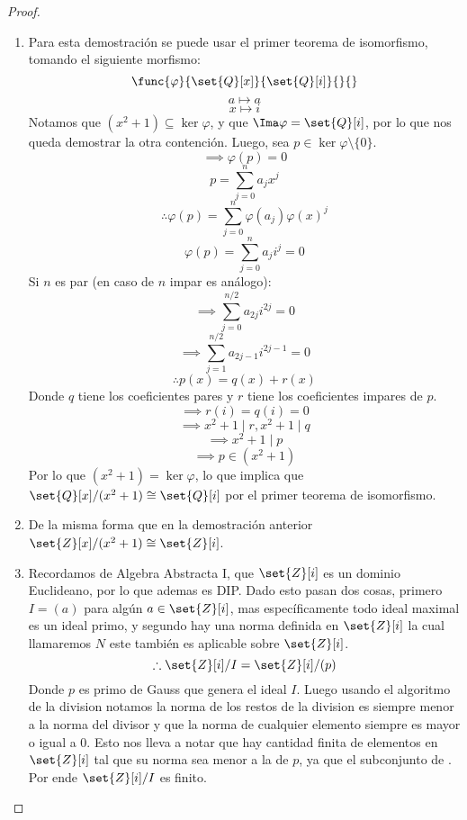 \documentclass[11pt]{article}
\begin{document}
\begin{enumerate}
\begin{proof}
\begin{enumerate}[label=(\alph*)]
                \item Para esta demostración se puede usar el primer teorema de isomorfismo, tomando el siguiente morfismo:
                \[\func{\varphi}{\set{Q}[x]}{\set{Q}[i]}{}{}\]
                \[a\mapsto a\]
                \[x\mapsto i\]
                Notamos que $(x^2+1)\subseteq\ker\varphi$, y que $\Ima\varphi=\set{Q}[i]$, por lo que nos queda demostrar la otra contención. Luego, sea $p\in\ker\varphi\setminus\{0\}$.
                \[\implies\varphi(p)=0\]
                \[p=\sum^n_{j=0}a_jx^j\]
                \[\therefore\varphi(p)=\sum^n_{j=0}\varphi(a_j)\varphi(x)^j\]
                \[\varphi(p)=\sum^n_{j=0}a_ji^j=0\]
                Si $n$ es par (en caso de $n$ impar es análogo):
                \[\implies \sum^{n/2}_{j=0}a_{2j}i^{2j}=0\]
                \[\implies \sum^{n/2}_{j=1}a_{2j-1}i^{2j-1}=0\]
                \[\therefore p(x)=q(x)+r(x)\]
                Donde $q$ tiene los coeficientes pares y $r$ tiene los coeficientes impares de $p$.
                \[\implies r(i)=q(i)=0\]
                \[\implies x^2+1\mid r,x^2+1\mid q\]
                \[\implies x^2+1\mid p\]
                \[\implies p\in (x^2+1)\]
                Por lo que $(x^2+1)=\ker\varphi$, lo que implica que $\set{Q}[x]/(x^2+1)\cong\set{Q}[i]$ por el primer teorema de isomorfismo.

                \item De la misma forma que en la demostración anterior $\set{Z}[x]/(x^2+1)\cong\set{Z}[i]$.

                \item Recordamos de Algebra Abstracta I, que $\set{Z}[i]$ es un dominio Euclideano\cite{artin2011algebra}, por lo que ademas es DIP. Dado esto pasan dos cosas, primero $I=(a)$ para algún $a\in\set{Z}[i]$, mas específicamente todo ideal maximal es un ideal primo, y segundo hay una norma definida en $\set{Z}[i]$ la cual llamaremos $N$ este también es aplicable sobre $\set{Z}[i]$.
                \[\therefore \set{Z}[i]/I=\set{Z}[i]/(p)\]
                Donde $p$ es primo de Gauss que genera el ideal $I$. Luego usando el algoritmo de la division notamos la norma de los restos de la division es siempre menor a la norma del divisor y que la norma de cualquier elemento siempre es mayor o igual a 0. Esto nos lleva a notar que hay cantidad finita de elementos en $\set{Z}[i]$ tal que su norma sea menor a la de $p$, ya que el subconjunto de . Por ende $\set{Z}[i]/I$ es finito.
            \end{enumerate}
        \end{proof}
    \end{enumerate}
    
    
    
\end{document}

